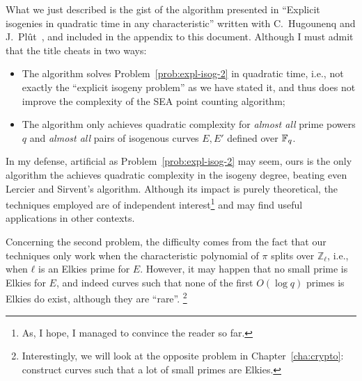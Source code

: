 \documentclass{report}
\theoremstyle{plain}
\theoremstyle{definition}
\begin{document}
What we just described is the gist of the algorithm presented in
``Explicit isogenies in quadratic time in any characteristic'' written
with C.~Hugounenq and J.~Plût~\cite{defeo2016explicit}, and included
in the appendix to this document. %
Although I must admit that the title cheats in two ways:
\begin{itemize}
\item The algorithm solves Problem~\ref{prob:expl-isog-2} in quadratic
  time, i.e., not exactly the ``explicit isogeny problem'' as we have
  stated it, and thus does not improve the complexity of the SEA point
  counting algorithm;
\item The algorithm only achieves quadratic complexity for
  \emph{almost all} prime powers $q$ and \emph{almost all} pairs of
  isogenous curves $E,E'$ defined over $\mathbb{F}_q$. %
\end{itemize}

In my defense, artificial as Problem~\ref{prob:expl-isog-2} may seem,
ours is the only algorithm the achieves quadratic complexity in the
isogeny degree, beating even Lercier and Sirvent's algorithm. %
Although its impact is purely theoretical, the techniques employed are
of independent interest\footnote{As, I hope, I managed to convince the
  reader so far.} and may find useful applications in other
contexts. %

Concerning the second problem, the difficulty comes from the fact that
our techniques only work when the characteristic polynomial of $π$
splits over $ℤ_ℓ$, i.e., when $ℓ$ is an Elkies prime for $E$. %
However, it may happen that no small prime is Elkies for $E$, and
indeed curves such that none of the first $O(\log q)$ primes is Elkies
do exist, although they are ``rare''.%
\footnote{Interestingly, we will look at the opposite problem in
  Chapter~\ref{cha:crypto}: construct curves such that a lot of small
  primes are Elkies.} %
\end{document}
